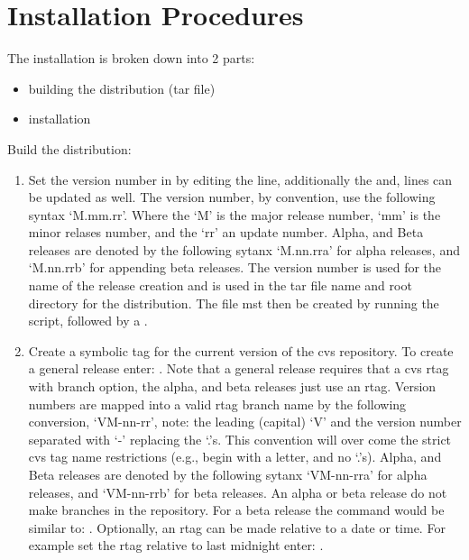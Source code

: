 \section{Installation Procedures}
\label{Installation Procedures}

The installation is broken down into 2 parts: 
  \begin{itemize}
  \item building the distribution (tar file)
  \item installation
  \end{itemize}

Build the \hypre{} distribution:

\begin{enumerate}

   \item Set the version number in  by editing
   the  line, additionally the
    and,
    lines can be updated as well.
   The version number, by convention, use the following syntax `M.mm.rr'.
   Where the `M' is the major release number, `mm' is the minor
   relases number, and the `rr' an update number. Alpha, and Beta 
   releases are denoted by the following sytanx `M.nn.rra' for 
   alpha releases, and `M.nn.rrb' for appending beta releases. The version 
   number is used for the name of the release creation and is used
   in the tar file name and root directory for the distribution. The
    file mst then be created by running the 
    script, followed by a .

   \item Create a symbolic tag for the current version
   of the cvs repository. To create a general release enter:
   . Note that a
   general release requires that a cvs rtag with branch option,
   the alpha, and beta releases just use an rtag.
   Version numbers are mapped into a valid rtag branch name by the
   following conversion, `VM-nn-rr', note: the leading (capital)
   `V' and the version number separated with `-' replacing
   the `.'s. This convention will over come the strict cvs
   tag name restrictions (e.g., begin with a letter, and no `.'s).
   Alpha, and Beta releases are denoted by the following sytanx 
   `VM-nn-rra' for alpha releases, and `VM-nn-rrb' for beta 
   releases. An alpha or beta release do not make branches in 
   the repository. For a beta release the command would be similar to: 
   . Optionally, an rtag
   can be made relative to a date or time. For example set the
   rtag relative to last midnight enter:
   .


\end{enumerate}
